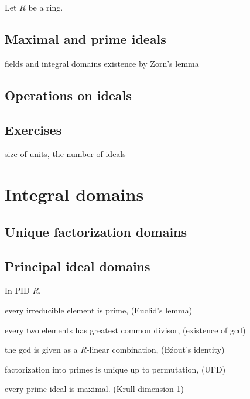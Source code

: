\documentclass{../../large}
\begin{document}
\begin{prb}
Let $R$ be a ring.
\end{prb}

\begin{prb}
\end{prb}
\begin{prb}
\end{prb}


\section{Maximal and prime ideals}
fields and integral domains
existence by Zorn's lemma

\section{Operations on ideals}

\section*{Exercises}
size of units, the number of ideals








\chapter{Integral domains}
\section{Unique factorization domains}
\section{Principal ideal domains}

\begin{prb}
In PID $R$,
\begin{parts}
\item every irreducible element is prime, \hfill(Euclid's lemma)
\item every two elements has greatest common divisor, \hfill(existence of gcd)
\item the gcd is given as a $R$-linear combination, \hfill(B\'zout's identity)
\item factorization into primes is unique up to permutation, \hfill(UFD)
\item every prime ideal is maximal. \hfill(Krull dimension 1)
\end{parts}
\end{prb}
\end{document}

